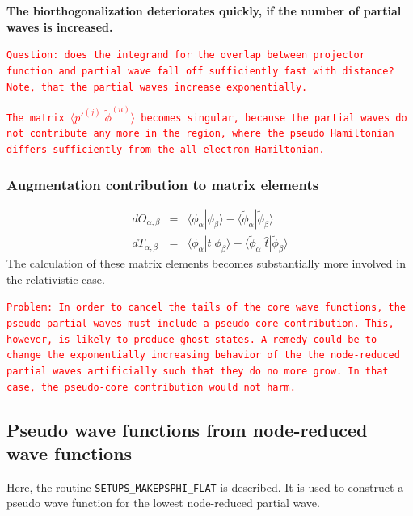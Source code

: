 \documentclass[11pt,a4paper]{report}
\newcommand{\petertt}[1]{\textcolor{red}{\texttt{#1}}}
\begin{document}
\textbf{The biorthogonalization deteriorates quickly, if the number of
  partial waves is increased.}

\petertt{Question: does the integrand for the overlap between
  projector function and partial wave fall off sufficiently fast with
  distance? Note, that the partial waves increase exponentially.}

\petertt{The matrix $\langle p'^{(j)}|\tilde{\phi}^{(n)}\rangle$
  becomes singular, because the partial waves do not contribute any
  more in the region, where the pseudo Hamiltonian differs
  sufficiently from the all-electron Hamiltonian.}


\subsubsection{Augmentation contribution to matrix elements}
\begin{eqnarray}
dO_{\alpha,\beta}&=&\langle\phi_\alpha|\phi_\beta\rangle-
\langle\tilde{\phi}_\alpha|\tilde{\phi}_\beta\rangle
\nonumber\\
dT_{\alpha,\beta}&=&\langle\phi_\alpha|\hat{t}|\phi_\beta\rangle-
\langle\tilde{\phi}_\alpha|\hat{t}|\tilde{\phi}_\beta\rangle
\end{eqnarray}
The calculation of these matrix elements becomes substantially more
involved in the relativistic case.

\petertt{Problem: In order to cancel the tails of the core wave
  functions, the pseudo partial waves must include a pseudo-core
  contribution. This, however, is likely to produce ghost states. A
  remedy could be to change the exponentially increasing behavior of
  the the node-reduced partial waves artificially such that they do no
  more grow. In that case, the pseudo-core contribution would not harm.}

\subsection{Pseudo wave functions from node-reduced wave functions}
\label{sec:determinedeltepseudo}
Here, the routine \verb|SETUPS_MAKEPSPHI_FLAT| is described. It is used
to construct a pseudo wave function for the lowest node-reduced
partial wave.
\end{document}
